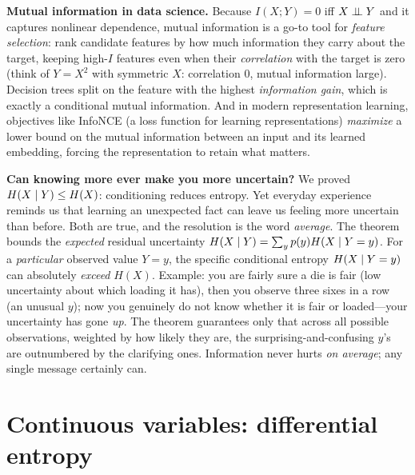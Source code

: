\begin{applicationbox}
\textbf{Mutual information in data science.} Because $I(X;Y) = 0$ iff $X \perp\!\!\!\perp Y$ and it captures
nonlinear dependence, mutual information is a go-to tool for \emph{feature selection}: rank candidate
features by how much information they carry about the target, keeping high-$I$ features even when their
\emph{correlation} with the target is zero (think of $Y = X^2$ with symmetric $X$: correlation $0$, mutual
information large). Decision trees split on the feature with the highest \emph{information gain}, which is
exactly a conditional mutual information. And in modern representation learning, objectives like InfoNCE (a loss function for learning representations)
\emph{maximize} a lower bound on the mutual information between an input and its learned embedding, forcing
the representation to retain what matters.
\end{applicationbox}

\begin{paradoxbox}
\textbf{Can knowing more ever make you more uncertain?} We proved $H(X\mid Y) \le H(X)$: conditioning
reduces entropy. Yet everyday experience reminds us that learning an unexpected fact can leave us feeling more uncertain than before. Both are
true, and the resolution is the word \emph{average}. The theorem bounds the \emph{expected} residual
uncertainty $H(X\mid Y) = \sum_y p(y)H(X\mid Y=y)$. For a \emph{particular} observed value $Y=y$, the
specific conditional entropy $H(X\mid Y=y)$ can absolutely \emph{exceed} $H(X)$. Example: you are fairly
sure a die is fair (low uncertainty about which loading it has), then you observe three sixes in a row
(an unusual $y$); now you genuinely do not know whether it is fair or loaded---your uncertainty has gone
\emph{up}. The theorem guarantees only that across all possible observations, weighted by how likely they
are, the surprising-and-confusing $y$'s are outnumbered by the clarifying ones. Information never hurts
\emph{on average}; any single message certainly can.
\end{paradoxbox}

\section{Continuous variables: differential entropy}
\label{ch33:differential}

